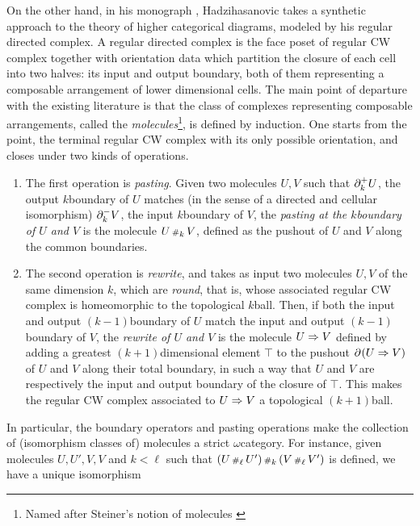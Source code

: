 On the other hand, in his monograph \cite{hadzihasanovic2024combinatorics}, Hadzihasanovic takes a synthetic approach to the theory of higher categorical diagrams, modeled by his regular directed complex.
A regular directed complex is the face poset of regular CW complex together with orientation data which partition the closure of each cell into two halves: its input and output boundary, both of them representing a composable arrangement of lower dimensional cells.
The main point of departure with the existing literature is that the class of complexes representing composable arrangements, called the \emph{molecules}\footnote{Named after Steiner's notion of molecules \cite{steiner1993algebra}}, is defined by induction.
One starts from the point, the terminal regular CW complex with its only possible orientation, and closes under two kinds of operations.
\begin{enumerate}
    \item The first operation is \emph{pasting}. Given two molecules \( U, V \) such that \( \partial_{k}^{+} U \), the output \( k \)\nbd boundary of \( U \) matches (in the sense of a directed and cellular isomorphism) \( \partial_{k}^{-} V \), the input \( k \)\nbd boundary of \( V \), the \emph{pasting at the \( k \)\nbd boundary of \( U \) and \( V \)} is the molecule \( U \,{\scriptstyle\#}_{k}\, V \), defined as the pushout of \( U \) and \( V \) along the common boundaries. 
    \item The second operation is \emph{rewrite}, and takes as input two molecules \( U, V \) of the same dimension \( k \), which are \emph{round}, that is, whose associated regular CW complex is homeomorphic to the topological \( k \)\nbd ball.
    Then, if both the input and output \( (k - 1) \)\nbd boundary of \( U \) match the input and output \( (k - 1) \)\nbd boundary of \( V \), the \emph{rewrite of \( U \) and \( V \)} is the molecule \( U \Rightarrow V \) defined by adding a greatest \( (k + 1) \)\nbd dimensional element \( \top \) to the pushout \( \partial_{}^{}(U \Rightarrow V) \) of \( U \) and \( V \) along their total boundary, in such a way that \( U \) and \( V \) are respectively the input and output boundary of the closure of \( \top \).
    This makes the regular CW complex associated to \( U \Rightarrow V \) a topological \( (k + 1) \)\nbd ball.
\end{enumerate}  
In particular, the boundary operators and pasting operations make the collection of (isomorphism classes of) molecules a strict \( \omega \)\nbd category.
For instance, given molecules \( U, U', V, V \) and \( k < \ell \) such that \( (U \,{\scriptstyle\#}_{\ell}\, U') \,{\scriptstyle\#}_{k}\, (V \,{\scriptstyle\#}_{\ell}\, V') \) is defined, we have a unique isomorphism
